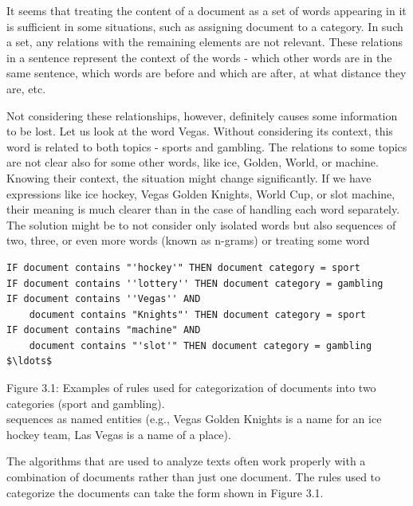 \documentclass[10pt]{book}
\begin{document}
It seems that treating the content of a document as a set of words appearing in it is sufficient in some situations, such as assigning document to a category. In such a set, any relations with the remaining elements are not relevant. These relations in a sentence represent the context of the words - which other words are in the same sentence, which words are before and which are after, at what distance they are, etc.

Not considering these relationships, however, definitely causes some information to be lost. Let us look at the word Vegas. Without considering its context, this word is related to both topics - sports and gambling. The relations to some topics are not clear also for some other words, like ice, Golden, World, or machine. Knowing their context, the situation might change significantly. If we have expressions like ice hockey, Vegas Golden Knights, World Cup, or slot machine, their meaning is much clearer than in the case of handling each word separately. The solution might be to not consider only isolated words but also sequences of two, three, or even more words (known as n-grams) or treating some word

\begin{verbatim}
IF document contains "'hockey'" THEN document category = sport
IF document contains ''lottery'' THEN document category = gambling
IF document contains ''Vegas'' AND
    document contains "Knights"' THEN document category = sport
IF document contains "machine" AND
    document contains "'slot'" THEN document category = gambling
$\ldots$
\end{verbatim}

Figure 3.1: Examples of rules used for categorization of documents into two categories (sport and gambling).\\
sequences as named entities (e.g., Vegas Golden Knights is a name for an ice hockey team, Las Vegas is a name of a place).

The algorithms that are used to analyze texts often work properly with a combination of documents rather than just one document. The rules used to categorize the documents can take the form shown in Figure 3.1.
\end{document}
